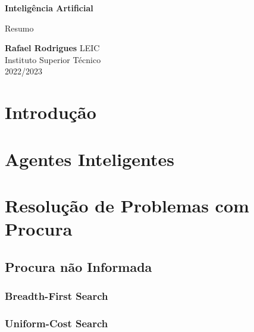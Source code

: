 \documentclass[12pt]{article}
\begin{document}
\begin{titlepage}
    \begin{center}
        \vspace*{1cm}

        \textbf{\LARGE Inteligência Artificial}
        \vspace{0.5cm}

        \Large Resumo
        \vspace{1.5cm}

        \textbf{Rafael Rodrigues}
        \vfill
        LEIC \\
        Instituto Superior Técnico \\
        2022/2023
    \end{center}
\end{titlepage}

\tableofcontents

\newpage

\section{Introdução}



\newpage

\section{Agentes Inteligentes}



\newpage

\section{Resolução de Problemas com Procura}



\subsection{Procura não Informada}



\subsubsection{Breadth-First Search}



\subsubsection{Uniform-Cost Search}
\end{document}

